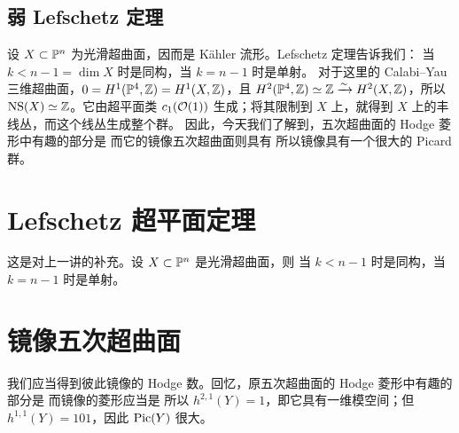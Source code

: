 \subsection{弱 Lefschetz 定理}
设 $X\subset\mathbb P^n$ 为光滑超曲面，因而是 Kähler 流形。Lefschetz 定理告诉我们：
当 $k<n-1=\dim X$ 时是同构，当 $k=n-1$ 时是单射。
对于这里的 Calabi–Yau 三维超曲面，$0=H^1(\mathbb P^4,\mathbb Z)=H^1(X,\mathbb Z)$，且 $H^2(\mathbb P^4,\mathbb Z)\simeq\mathbb Z\xrightarrow{\sim}H^2(X,\mathbb Z)$，所以 $\mathrm{NS}(X)\simeq\mathbb Z$。它由超平面类 $c_1(\mathcal O(1))$ 生成；将其限制到 $X$ 上，就得到 $X$ 上的丰线丛，而这个线丛生成整个群。
因此，今天我们了解到，五次超曲面的 Hodge 菱形中有趣的部分是
而它的镜像五次超曲面则具有
所以镜像具有一个很大的 Picard 群。
\section{Lefschetz 超平面定理}
这是对上一讲的补充。设 $X\subset\mathbb P^n$ 是光滑超曲面，则
当 $k<n-1$ 时是同构，当 $k=n-1$ 时是单射。
\section{镜像五次超曲面}
我们应当得到彼此镜像的 Hodge 数。回忆，原五次超曲面的 Hodge 菱形中有趣的部分是
而镜像的菱形应当是
所以 $h^{2,1}(Y)=1$，即它具有一维模空间；但 $h^{1,1}(Y)=101$，因此 $\operatorname{Pic}(Y)$ 很大。
